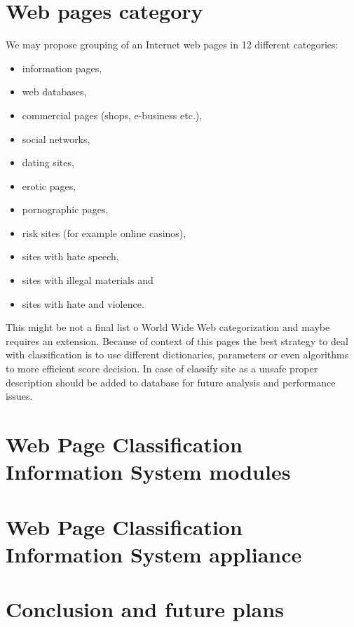 \documentclass[9pt,a4paper]{extarticle}
\begin{document}
\begin{multicols}{2}
\section{Web pages category}
We may propose grouping of an Internet web pages in 12 different categories:
\begin{itemize}
\item information pages,
\item web databases,
\item commercial pages (shops, e-business etc.),
\item social networks,
\item dating sites,
\item erotic pages,
\item pornographic pages,
\item risk sites (for example online casinos),
\item sites with hate speech,
\item sites with illegal materials and
\item sites with hate and violence.
\end{itemize}
This might be not a final list o World Wide Web categorization and maybe requires an extension. Because of context of this pages the best strategy to deal with classification is to use different dictionaries, parameters or even algorithms to more efficient score decision. In case of classify site as a unsafe proper description should be added to database for future analysis and performance issues.

\section{Web Page Classification Information System modules}

\section{Web Page Classification Information System appliance}

\section{Conclusion and future plans}







\end{multicols}
\end{document}
